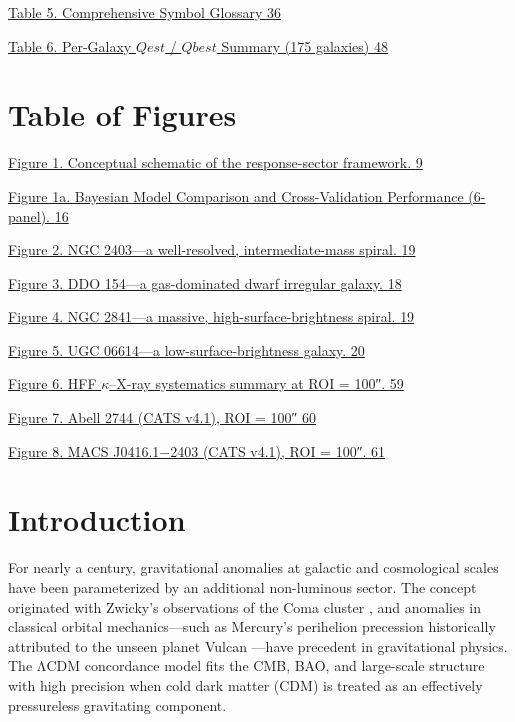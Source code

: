 \documentclass[11pt]{article}
\begin{document}
\hyperref[_Toc222952635]{Table 5. Comprehensive Symbol Glossary \hyperref[_Toc222952635]{36}}

\hyperref[_Toc222952636]{Table 6. Per-Galaxy \(Qest\) / \(Qbest\) Summary (175 galaxies) \hyperref[_Toc222952636]{48}}

\section{Table of Figures}\label{table-of-figures}

\hyperref[_Toc222952637]{Figure 1. Conceptual schematic of the response-sector framework. \hyperref[_Toc222952637]{9}}

\hyperref[fig:bic_cv_1]{Figure 1a. Bayesian Model Comparison and Cross-Validation Performance (6-panel). \hyperref[fig:bic_cv_1]{16}}

\hyperref[_Toc222952638]{Figure 2. NGC 2403---a well-resolved, intermediate-mass spiral. \hyperref[_Toc222952638]{19}}

\hyperref[_Toc222952639]{Figure 3. DDO 154---a gas-dominated dwarf irregular galaxy. \hyperref[_Toc222952639]{18}}

\hyperref[_Toc222952640]{Figure 4. NGC 2841---a massive, high-surface-brightness spiral. \hyperref[_Toc222952640]{19}}

\hyperref[_Toc222952641]{Figure 5. UGC 06614---a low-surface-brightness galaxy. \hyperref[_Toc222952641]{20}}

\hyperref[_Toc222952642]{Figure 6. HFF \(\kappa\)--X-ray systematics summary at ROI = 100″. \hyperref[_Toc222952642]{59}}

\hyperref[_Toc222952643]{Figure 7. Abell 2744 (CATS v4.1), ROI = 100″ \hyperref[_Toc222952643]{60}}

\hyperref[_Toc222952644]{Figure 8. MACS J0416.1−2403 (CATS v4.1), ROI = 100″. \hyperref[_Toc222952644]{61}}

\fi

\section{Introduction}\label{introduction}

For nearly a century, gravitational anomalies at galactic and cosmological scales have been parameterized by an additional non-luminous sector. The concept originated with Zwicky's observations of the Coma cluster \citep{Zwicky1933}, and anomalies in classical orbital mechanics---such as Mercury's perihelion precession historically attributed to the unseen planet Vulcan \citep{LeVerrier1859}---have precedent in gravitational physics. The ΛCDM concordance model fits the CMB, BAO, and large-scale structure \citep{Riess2019, Ivezic2019, Euclid2022, Euclid2025} with high precision when cold dark matter (CDM) is treated as an effectively pressureless gravitating component.
\end{document}
